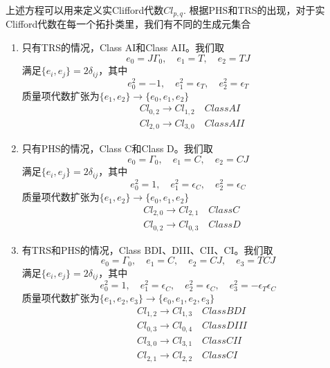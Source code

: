 \documentclass[a4paper]{article}
\numberwithin{equation}{subsection}
\begin{document}
上述方程可以用来定义实Clifford代数$Cl_{p,q}$. 根据PHS和TRS的出现，对于实Clifford代数在每一个拓扑类里，我们有不同的生成元集合
\begin{enumerate}
    \item 只有TRS的情况，Class AI和Class AII。我们取
    \begin{equation}
        e_0=J\Gamma_0,\quad e_1=T,\quad e_2=TJ
    \end{equation}
    满足$\{e_i,e_j\}=2\delta_{ij}$，其中
    \begin{equation}
        e_0^2=-1,\quad e_1^2=\epsilon_T,\quad e_2^2=\epsilon_T
    \end{equation}
    质量项代数扩张为$\{e_1,e_2\}\rightarrow \{e_0,e_1,e_2\}$
    \begin{equation}
        \begin{split}
            &Cl_{0,2}\rightarrow Cl_{1,2}\quad Class AI\\
            &Cl_{2,0}\rightarrow Cl_{3,0}\quad Class AII
        \end{split}
    \end{equation}
    \item 只有PHS的情况，Class C和Class D。我们取
    \begin{equation}
        e_0=\Gamma_0,\quad e_1=C,\quad e_2=CJ
    \end{equation}
    满足$\{e_i,e_j\}=2\delta_{ij}$，其中
    \begin{equation}
        e_0^2=1,\quad e_1^2=\epsilon_C,\quad e_2^2=\epsilon_C
    \end{equation}
    质量项代数扩张为$\{e_1,e_2\}\rightarrow \{e_0,e_1,e_2\}$
    \begin{equation}
        \begin{split}
            &Cl_{2,0}\rightarrow Cl_{2,1}\quad Class C\\
            &Cl_{0,2}\rightarrow Cl_{0,3}\quad Class D
        \end{split}
    \end{equation}
    \item 有TRS和PHS的情况，Class BDI、DIII、CII、CI。我们取
    \begin{equation}
        e_0=\Gamma_0,\quad e_1=C,\quad e_2=CJ,\quad e_3=TCJ
    \end{equation}
    满足$\{e_i,e_j\}=2\delta_{ij}$，其中
    \begin{equation}
        e_0^2=1,\quad e_1^2=\epsilon_C,\quad e_2^2=\epsilon_C,\quad e_3^2=-\epsilon_T\epsilon_C
    \end{equation}
    质量项代数扩张为$\{e_1,e_2,e_3\}\rightarrow\{e_0,e_1,e_2,e_3\}$
    \begin{equation}
        \begin{split}
            &Cl_{1,2}\rightarrow Cl_{1,3}\quad Class BDI\\
            &Cl_{0,3}\rightarrow Cl_{0,4}\quad Class DIII\\
            &Cl_{3,0}\rightarrow Cl_{3,1}\quad Class CII\\
            &Cl_{2,1}\rightarrow Cl_{2,2}\quad Class CI
        \end{split}
    \end{equation}
\end{enumerate}
\end{document}
